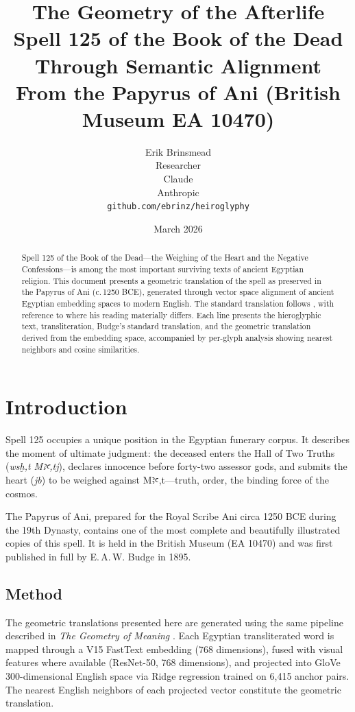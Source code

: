 \documentclass[11pt, a4paper]{article}
\title{
    \textbf{The Geometry of the Afterlife}\\[6pt]
    {\large Spell 125 of the Book of the Dead\\Through Semantic Alignment}\\[6pt]
    {\normalsize From the Papyrus of Ani (British Museum EA 10470)}
}
\author{
    Erik Brinsmead \\
    Researcher \\[6pt]
    Claude \\
    Anthropic \\[12pt]
    \texttt{github.com/ebrinz/heiroglyphy}
}
\date{March 2026}
\begin{document}
\maketitle

\begin{abstract}
Spell 125 of the Book of the Dead---the Weighing of the Heart and the Negative Confessions---is among the most important surviving texts of ancient Egyptian religion. This document presents a geometric translation of the spell as preserved in the Papyrus of Ani (c.\,1250 BCE), generated through vector space alignment of ancient Egyptian embedding spaces to modern English. The standard translation follows \citet{budge1895papyrus}, with reference to \citet{faulkner1972book} where his reading materially differs. Each line presents the hieroglyphic text, transliteration, Budge's standard translation, and the geometric translation derived from the embedding space, accompanied by per-glyph analysis showing nearest neighbors and cosine similarities.
\end{abstract}

\tableofcontents

\section{Introduction}
\label{sec:intro}

Spell 125 occupies a unique position in the Egyptian funerary corpus. It describes the moment of ultimate judgment: the deceased enters the Hall of Two Truths (\textit{wsḫ,t Mꜣꜥ,tj}), declares innocence before forty-two assessor gods, and submits the heart (\textit{jb}) to be weighed against Mꜣꜥ,t---truth, order, the binding force of the cosmos.

The Papyrus of Ani, prepared for the Royal Scribe Ani circa 1250 BCE during the 19th Dynasty, contains one of the most complete and beautifully illustrated copies of this spell. It is held in the British Museum (EA 10470) and was first published in full by E.\,A.\,W. Budge in 1895.

\subsection{Method}

The geometric translations presented here are generated using the same pipeline described in \textit{The Geometry of Meaning} \citep{brinsmead2026geometry}. Each Egyptian transliterated word is mapped through a V15 FastText embedding (768 dimensions), fused with visual features where available (ResNet-50, 768 dimensions), and projected into GloVe 300-dimensional English space via Ridge regression trained on 6,415 anchor pairs. The nearest English neighbors of each projected vector constitute the geometric translation.
\end{document}

